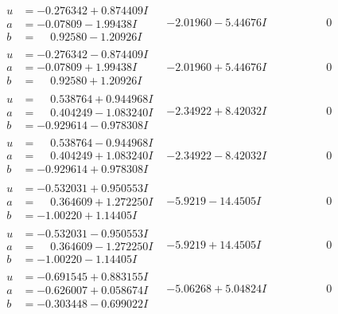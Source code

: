 \documentclass[1p]{elsarticle_modified}
\theoremstyle{definition}
\begin{document}
$$\begin{array}{c|c|c}
\begin{aligned}
u &= -0.276342 + 0.874409 I \\
a &= -0.07809 - 1.99438 I \\
b &= \phantom{-}0.92580 - 1.20926 I\end{aligned}
 & -2.01960 - 5.44676 I & \phantom{-0.000000 } 0 \\ \hline\begin{aligned}
u &= -0.276342 - 0.874409 I \\
a &= -0.07809 + 1.99438 I \\
b &= \phantom{-}0.92580 + 1.20926 I\end{aligned}
 & -2.01960 + 5.44676 I & \phantom{-0.000000 } 0 \\ \hline\begin{aligned}
u &= \phantom{-}0.538764 + 0.944968 I \\
a &= \phantom{-}0.404249 - 1.083240 I \\
b &= -0.929614 - 0.978308 I\end{aligned}
 & -2.34922 + 8.42032 I & \phantom{-0.000000 } 0 \\ \hline\begin{aligned}
u &= \phantom{-}0.538764 - 0.944968 I \\
a &= \phantom{-}0.404249 + 1.083240 I \\
b &= -0.929614 + 0.978308 I\end{aligned}
 & -2.34922 - 8.42032 I & \phantom{-0.000000 } 0 \\ \hline\begin{aligned}
u &= -0.532031 + 0.950553 I \\
a &= \phantom{-}0.364609 + 1.272250 I \\
b &= -1.00220 + 1.14405 I\end{aligned}
 & -5.9219 - 14.4505 I & \phantom{-0.000000 } 0 \\ \hline\begin{aligned}
u &= -0.532031 - 0.950553 I \\
a &= \phantom{-}0.364609 - 1.272250 I \\
b &= -1.00220 - 1.14405 I\end{aligned}
 & -5.9219 + 14.4505 I & \phantom{-0.000000 } 0 \\ \hline\begin{aligned}
u &= -0.691545 + 0.883155 I \\
a &= -0.626007 + 0.058674 I \\
b &= -0.303448 - 0.699022 I\end{aligned}
 & -5.06268 + 5.04824 I & \phantom{-0.000000 } 0 \\ \hline\begin{aligned}

\end{aligned}
\end{array}$$
\end{document}
